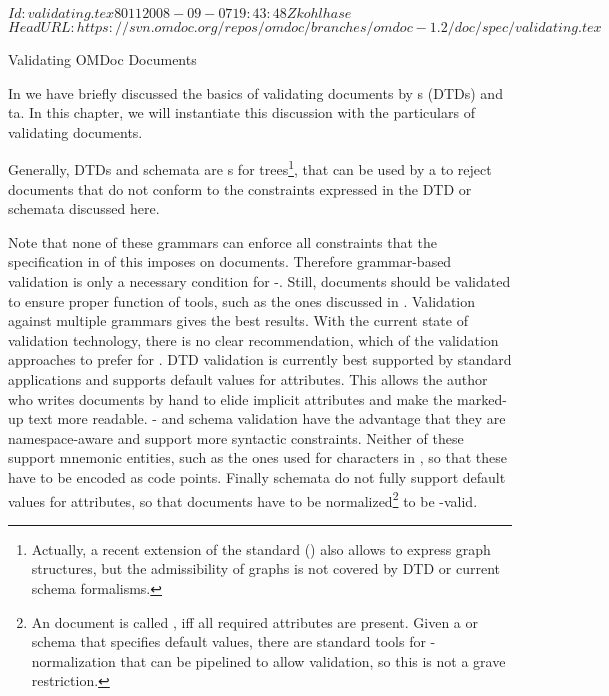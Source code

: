 \svnInfo $Id: validating.tex 8011 2008-09-07 19:43:48Z kohlhase $
\svnKeyword $HeadURL: https://svn.omdoc.org/repos/omdoc/branches/omdoc-1.2/doc/spec/validating.tex $

\begin{tchapter}[id=validating]{Validating OMDoc Documents}

In {} we have briefly discussed the basics of validating {\xml}
documents by {s} (DTDs) and {ta}. In
this chapter, we will instantiate this discussion with the particulars of
validating {\omdoc} documents.

Generally, DTDs and schemata are {s} for
trees\footnote{Actually, a recent extension of the {\xml} standard ({\xlink}) also allows
  to express graph structures, but the admissibility of graphs is not covered by DTD or
  current schema formalisms.}, that can be used by a {} to
reject {\xml} documents that do not conform to the constraints expressed in the {\omdoc}
DTD or schemata discussed here.

Note that none of these grammars can enforce all constraints that the {\omdoc}
specification in {} of this {\report} imposes on documents.
Therefore grammar-based validation is only a necessary condition for
{\omdoc}-{}. Still, {\omdoc} documents should be validated to ensure
proper function of {\omdoc} tools, such as the ones discussed in
{}.  Validation against multiple grammars gives the
best results. With the current state of validation technology, there is no clear
recommendation, which of the validation approaches to prefer for {\omdoc}. DTD validation
is currently best supported by standard {\xml} applications and supports default values
for attributes. This allows the author who writes {\omdoc} documents by hand to elide
implicit attributes and make the marked-up text more readable.  {\xml}- and {\relaxng}
schema validation have the advantage that they are namespace-aware and support more
syntactic constraints.  Neither of these support mnemonic {\xml}
entities, such as the ones used for {\unicode} characters in {\pmathml},
so that these have to be encoded as {\unicode} code points. Finally {\relaxng} schemata do
not fully support default values for attributes, so that {\omdoc} documents have to be
normalized\footnote{An {\omdoc} document is called {}, iff all required
  attributes are present. Given a {} or {\xml} schema that
  specifies default values, there are standard {\xml} tools for {\xml}-normalization that
  can be pipelined to allow {\relaxng} validation, so this is not a grave restriction.} to
be {\relaxng}-valid.


\end{tchapter}
